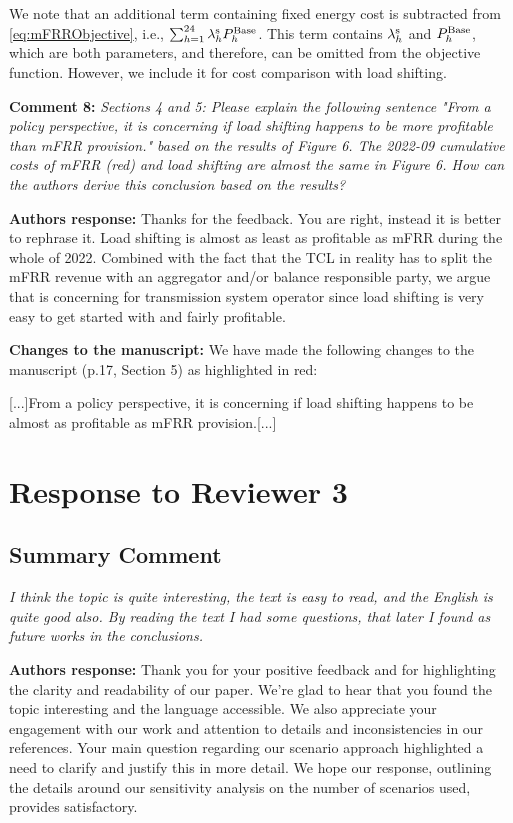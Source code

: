\documentclass[10pt]{article}
\newcommand{\nt}[1]{\textcolor{newtextcolor}{#1}}
\newcommand{\auth}{\textbf{Authors response: }}
\newcommand{\changes}{\textbf{Changes to the manuscript: }}
\begin{document}
\nt{
We note that an additional term containing fixed energy cost is subtracted from \eqref{eq:mFRRObjective}, i.e., $\sum_{h=1}^{24} \lambda^{\rm{s}}_{h}P^{\rm{Base}}_{h}$. This term contains $\lambda^{\rm{s}}_{h}$ and $P^{\rm{Base}}_{h}$, which are both parameters, and therefore, can be omitted from the objective function. However, we include it for cost comparison with load shifting.
}

\textbf{Comment 8:} \textit{Sections 4 and 5: Please explain the following sentence "From a policy perspective, it is concerning if load shifting happens to be more profitable than mFRR provision." based on the results of Figure 6. The 2022-09 cumulative costs of mFRR (red) and load shifting are almost the same in Figure 6. How can the authors derive this conclusion based on the results?}

\auth Thanks for the feedback. You are right, instead it is better to rephrase it. Load shifting is almost as least as profitable as mFRR during the whole of 2022. Combined with the fact that the TCL in reality has to split the mFRR revenue with an aggregator and/or balance responsible party, we argue that is concerning for transmission system operator since load shifting is very easy to get started with and fairly profitable.

\changes We have made the following changes to the manuscript (p.17, Section 5) as highlighted in red:

[...]From a policy perspective, it is concerning if load shifting happens to be \nt{almost as} profitable \nt{as} mFRR provision.[...]


\newpage
\section{Response to Reviewer 3}

\subsection{Summary Comment} \textit{I think the topic is quite interesting, the text is easy to read, and the English is quite good also. By reading the text I had some questions, that later I found as future works in the conclusions.}

\auth Thank you for your positive feedback and for highlighting the clarity and readability of our paper. We're glad to hear that you found the topic interesting and the language accessible. We also appreciate your engagement with our work and attention to details and inconsistencies in our references. Your main question regarding our scenario approach highlighted a need to clarify and justify this in more detail. We hope our response, outlining the details around our sensitivity analysis on the number of scenarios used, provides satisfactory.
\end{document}
